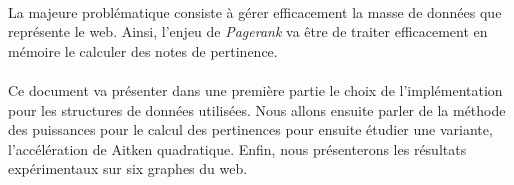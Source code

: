 		\paragraph{}La majeure problématique consiste à gérer efficacement la masse de données que représente le web. Ainsi, l'enjeu de \textit{Pagerank} va être de traiter efficacement en mémoire le calculer des notes de pertinence.
		\paragraph{}Ce document va présenter dans une première partie le choix de l'implémentation pour les structures de données utilisées. Nous allons ensuite parler de la méthode des puissances pour le calcul des pertinences pour ensuite étudier une variante, l'accélération de Aitken quadratique. Enfin, nous présenterons les résultats expérimentaux sur six graphes du web.
		
	
	
	
	
		

